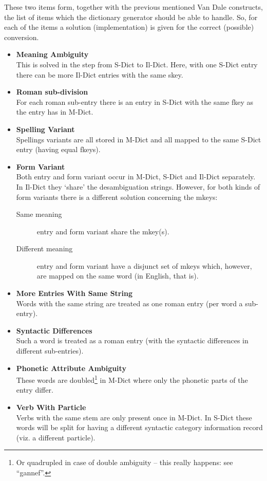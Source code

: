 These two items form, together with the previous mentioned Van Dale constructs,
the list of items which the dictionary generator should be able to handle. So, 
for each of the items a solution (implementation) is given for the correct 
(possible) conversion. 
 
\begin{itemize}
  \item {\bf Meaning Ambiguity}\\
        This is solved in the step from S-Dict to Il-Dict. Here, with one S-Dict
        entry there can be more Il-Dict entries with the same skey.
  \item {\bf Roman sub-division}\\
        For each roman sub-entry there is an entry in S-Dict with the same fkey
        as the entry has in M-Dict.
  \item {\bf Spelling Variant}\\
        Spellings variants are all stored in M-Dict and all mapped to the same
        S-Dict entry (having equal fkeys).
  \item {\bf Form Variant}\\
        Both entry and form variant occur in M-Dict, S-Dict and Il-Dict 
        separately. In Il-Dict they `share' the desambiguation strings.
        However, for both kinds of form variants there is a different solution 
        concerning the mkeys:
        \begin{description}
           \item [Same meaning] entry and form variant share the mkey(s).
           \item [Different meaning] entry and form variant have a disjunct
                 set of mkeys which, however, are mapped on the same word (in
                 English, that is).
        \end{description}
  \item {\bf More Entries With Same String}\\
        Words with the same string are treated as one roman entry (per word
        a sub-entry).
  \item {\bf Syntactic Differences}\\
        Such a word is treated as a roman entry (with the syntactic 
        differences in different sub-entries).
  \item {\bf Phonetic Attribute Ambiguity}\\
        These words are doubled\footnote{Or quadrupled in case of double 
        ambiguity -- this really happens: see ``gannef''.} in M-Dict where only 
        the phonetic parts of the entry differ.
  \item {\bf Verb With Particle}\\
        Verbs with the same stem are only present once in M-Dict. In S-Dict 
        these words will be split for having a different syntactic category 
        information record (viz. a different particle). 
\end{itemize}
 
